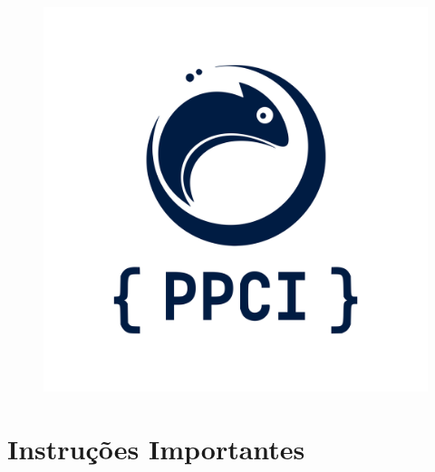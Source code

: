 \documentclass[12pt,oneside]{article} %
\begin{document}
\begin{center}
\begin{figure}[h!]
    \centering
    \includegraphics[scale=0.20]{logo-PPCI.png}
\end{figure}
\vspace{1.0cm}
\vspace{1.0cm}
\end{center}

\clearpage

\pagestyle{fancy}
\renewcommand{\footrulewidth}{0.7pt}
\renewcommand{\headrulewidth}{0.7pt}
\cfoot{\thepage}

\newpage

  \section*{Instruções Importantes}
\end{document}

